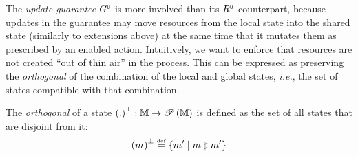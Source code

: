 The \emph{update guarantee} $G^{\textsf{u}}$ is more involved than its
$R^{\textsf{u}}$ counterpart, because updates in the guarantee may move
resources from the local state into the shared state (similarly to
extensions above) at the same time that it mutates them as prescribed
by an enabled action. Intuitively, we want to enforce that resources
are not created ``out of thin air'' in the process. This can be
expressed as preserving the \emph{orthogonal} of the combination of
the local and global states, \textit{i.e.}, the set of states
compatible with that combination.

\begin{definition}[Orthogonal]\label{def:orthogonal}
The \emph{orthogonal} of a state  $\left(.\right)^{\bot}: \mathbb{M} \rightarrow
\mathscr{P}\left(\mathbb{M} \right)$ is defined as the set of all states that are disjoint
from it:
\vspace{-1ex}
\[
\vspace{-1ex}
\heapSize{\h{}} \eqdef \left\{ \h{}' \mid \h{} \compatL \h{}' \right\}
\]
\end{definition}

